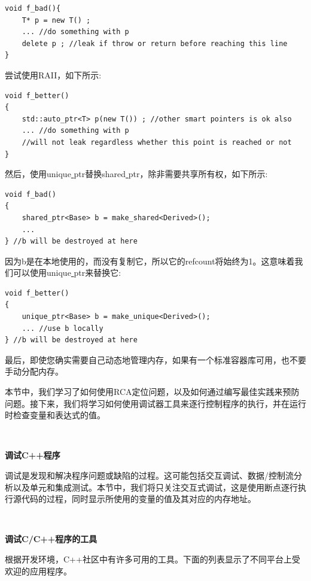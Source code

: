 \begin{lstlisting}[caption={}]
void f_bad(){
	T* p = new T() ;
	... //do something with p
	delete p ; //leak if throw or return before reaching this line
}
\end{lstlisting}

尝试使用RAII，如下所示: \par

\begin{lstlisting}[caption={}]
void f_better()
{
	std::auto_ptr<T> p(new T()) ; //other smart pointers is ok also
	... //do something with p
	//will not leak regardless whether this point is reached or not
}
\end{lstlisting}

然后，使用unique\underline{ }ptr替换shared\underline{ }ptr，除非需要共享所有权，如下所示: \par

\begin{lstlisting}[caption={}]
void f_bad()
{
	shared_ptr<Base> b = make_shared<Derived>();
	...
} //b will be destroyed at here
\end{lstlisting}

因为b是在本地使用的，而没有复制它，所以它的refcount将始终为1。这意味着我们可以使用unique\underline{ }ptr来替换它: \par

\begin{lstlisting}[caption={}]
void f_better()
{
	unique_ptr<Base> b = make_unique<Derived>();
	... //use b locally
} //b will be destroyed at here
\end{lstlisting}

最后，即使您确实需要自己动态地管理内存，如果有一个标准容器库可用，也不要手动分配内存。 \par
本节中，我们学习了如何使用RCA定位问题，以及如何通过编写最佳实践来预防问题。接下来，我们将学习如何使用调试器工具来逐行控制程序的执行，并在运行时检查变量和表达式的值。 \par

\noindent\textbf{}\ \par
\textbf{调试C++程序} \ \par
调试是发现和解决程序问题或缺陷的过程。这可能包括交互调试、数据/控制流分析以及单元和集成测试。本节中，我们将只关注交互式调试，这是使用断点逐行执行源代码的过程，同时显示所使用的变量的值及其对应的内存地址。 \par

\noindent\textbf{}\ \par
\textbf{调试C/C++程序的工具} \ \par
根据开发环境，C++社区中有许多可用的工具。下面的列表显示了不同平台上受欢迎的应用程序。 \par

